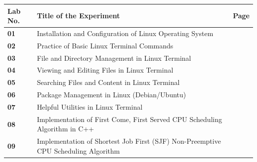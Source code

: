 \documentclass[10pt,a4paper,portrait]{article}
\begin{document}
\vspace{0.18cm}

\begin{center}
{\renewcommand{\arraystretch}{1.34}%
\setlength{\arrayrulewidth}{0.5pt}%
%
\begin{tabularx}{\linewidth}{|>{\centering\arraybackslash}m{1.6cm}|>{\raggedright\arraybackslash}X|>{\centering\arraybackslash}m{1.5cm}|}
\hline
\rowcolor{primary}
\textbf{\color{white}\sffamily\footnotesize Lab No.} & 
\textbf{\color{white}\sffamily\footnotesize Title of the Experiment} & 
\textbf{\color{white}\sffamily\footnotesize Page} \\
\hline
\rowcolor{white}
{\color{primary}\sffamily\bfseries\footnotesize 01} & {\sffamily\footnotesize\color{darkslate} Installation and Configuration of Linux Operating System} & \\
\hline
\rowcolor{cardbg}
{\color{primary}\sffamily\bfseries\footnotesize 02} & {\sffamily\footnotesize\color{darkslate} Practice of Basic Linux Terminal Commands} & \\
\hline
\rowcolor{white}
{\color{primary}\sffamily\bfseries\footnotesize 03} & {\sffamily\footnotesize\color{darkslate} File and Directory Management in Linux Terminal} & \\
\hline
\rowcolor{cardbg}
{\color{primary}\sffamily\bfseries\footnotesize 04} & {\sffamily\footnotesize\color{darkslate} Viewing and Editing Files in Linux Terminal} & \\
\hline
\rowcolor{white}
{\color{primary}\sffamily\bfseries\footnotesize 05} & {\sffamily\footnotesize\color{darkslate} Searching Files and Content in Linux Terminal} & \\
\hline
\rowcolor{cardbg}
{\color{primary}\sffamily\bfseries\footnotesize 06} & {\sffamily\footnotesize\color{darkslate} Package Management in Linux (Debian/Ubuntu)} & \\
\hline
\rowcolor{white}
{\color{primary}\sffamily\bfseries\footnotesize 07} & {\sffamily\footnotesize\color{darkslate} Helpful Utilities in Linux Terminal} & \\
\hline
\rowcolor{cardbg}
{\color{primary}\sffamily\bfseries\footnotesize 08} & {\sffamily\footnotesize\color{darkslate} Implementation of First Come, First Served CPU Scheduling Algorithm in C++} & \\
\hline
\rowcolor{white}
{\color{primary}\sffamily\bfseries\footnotesize 09} & {\sffamily\footnotesize\color{darkslate} Implementation of Shortest Job First (SJF) Non-Preemptive CPU Scheduling Algorithm} & \\

\end{tabularx}}
\end{center}
\end{document}
